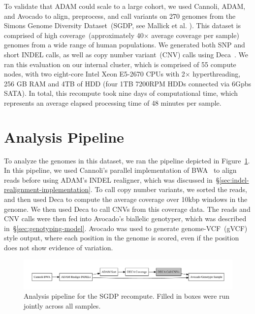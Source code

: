 \documentclass[phd]{ucbthesis}
\begin{document}
To validate that ADAM could scale to a large cohort, we used Cannoli, ADAM, and
Avocado to align, preprocess, and call variants on 270 genomes from the Simons
Genome Diversity Dataset~(SGDP, see Mallick et al. \cite{mallick16}). This dataset
is comprised of high
coverage~(approximately 40$\times$ average coverage per sample) genomes from a
wide range of human populations. We generated both SNP and short INDEL calls, as
well as copy number variant~(CNV) calls using Deca~\cite{linderman17}. We ran this
evaluation on our internal cluster, which is comprised of 55 compute nodes, with
two eight-core Intel Xeon E5-2670 CPUs with 2$\times$ hyperthreading, 256 GB RAM
and 4TB of HDD (four 1TB 7200RPM HDDs connected via 6Gpbs SATA). In total, this
recompute took nine days of computational time, which represents an average
elapsed processing time of 48 minutes per sample.

\section{Analysis Pipeline}
\label{sec:analysis-pipeline}

To analyze the genomes in this dataset, we ran the pipeline depicted in
Figure~\ref{fig:sgdp-pipeline}. In this pipeline, we used Cannoli's parallel
implementation of BWA~\cite{li13} to align reads before using ADAM's
INDEL realigner, which was discussed in~\S\ref{sec:indel-realignment-implementation}.
To call copy number variants, we sorted the reads, and then used Deca to compute
the average coverage over 10kbp windows in the genome. We then used Deca to call
CNVs from this coverage data. The reads and CNV calls were then fed into
Avocado's biallelic genotyper, which was described in~\S\ref{sec:genotyping-model}.
Avocado was used to generate genome-VCF~(gVCF) style output, where each position
in the genome is scored, even if the position does not show evidence of
variation.

\begin{figure}[h]
  \begin{center}
    \includegraphics[width=0.95\linewidth]{graphs/pipeline.pdf}
  \end{center}
  \caption{Analysis pipeline for the SGDP recompute. Filled in boxes were run
    jointly across all samples.}
  \label{fig:sgdp-pipeline}
\end{figure}
\end{document}
